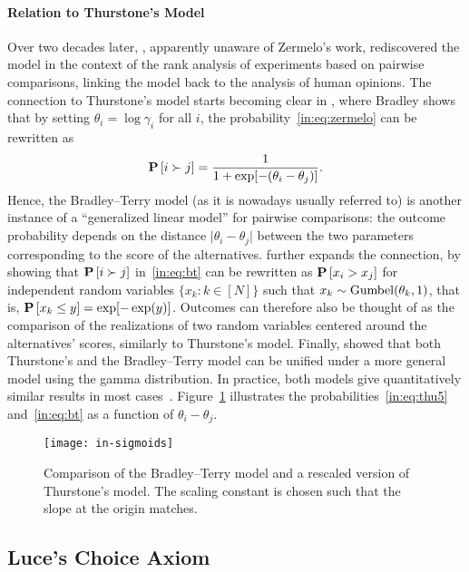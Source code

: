 \paragraph{Relation to Thurstone's Model}
Over two decades later, \citet{bradley1952rank}, apparently unaware of Zermelo's work, rediscovered the model in the context of the rank analysis of experiments based on pairwise comparisons, linking the model back to the analysis of human opinions.
The connection to Thurstone's model starts becoming clear in \citet{bradley1953some}, where Bradley shows that by setting $\theta_i = \log \gamma_i$ for all $i$, the probability~\eqref{in:eq:zermelo} can be rewritten as
\begin{align}
\label{in:eq:bt}
\mathbf{P}\left[ i \succ j \right] = \frac{1}{1 + \exp[-(\theta_i - \theta_j)]}.
\end{align}
Hence, the Bradley--Terry model (as it is nowadays usually referred to) is another instance of a ``generalized linear model'' for pairwise comparisons: the outcome probability depends on the distance $\lvert \theta_i - \theta_j \rvert$ between the two parameters corresponding to the score of the alternatives.
\citet{yellot1977relationship} further expands the connection, by showing that $\mathbf{P}\left[ i \succ j \right]$ in~\eqref{in:eq:bt} can be rewritten as $\mathbf{P}\left[ x_i > x_j \right]$ for independent random variables $\{x_k : k \in [N]\}$ such that $x_k \sim \mathrm{Gumbel}( \theta_k, 1 )$, that is, $\mathbf{P}\left[ x_k \le y \right] = \exp[-\exp(y)]$.
Outcomes can therefore also be thought of as the comparison of the realizations of two random variables centered around the alternatives' scores, similarly to Thurstone's model.
Finally, \citet{stern1992all} showed that both Thurstone's and the Bradley--Terry model can be unified under a more general model using the gamma distribution.
In practice, both models give quantitatively similar results in most cases~\citep{tsukida2011how}.
Figure~\ref{in:fig:sigmoids} illustrates the probabilities~\eqref{in:eq:thu5} and~\eqref{in:eq:bt} as a function of $\theta_i - \theta_j$.

\begin{figure}[ht]
\centering
\texttt{[image: in-sigmoids]}
\caption{
Comparison of the Bradley--Terry model and a rescaled version of Thurstone's model.
The scaling constant is chosen such that the slope at the origin matches.
}
\label{in:fig:sigmoids}
\end{figure}


\subsection{Luce's Choice Axiom}

